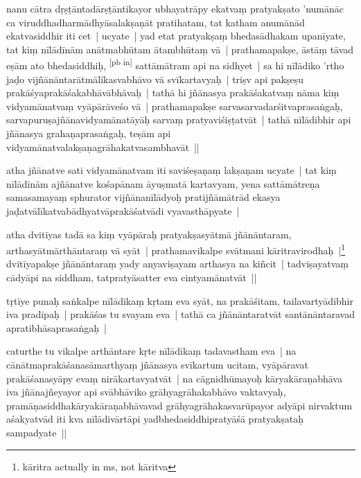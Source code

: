 \documentclass[article,a4paper]{memoir}
\begin{document}
	  \pstart nanu cā\-tra dṛṣṭā\-ntadā\-rṣṭā\-ntikayor ubhayatrā\-py ekatvaṃ pratyakṣato 'numā\-nā\-c ca viruddhadharmā\-dhyā\-salakṣaṇā\-t pratihatam, tat katham anumā\-nā\-d ekatvasiddhir iti cet | ucyate | yad etat pratyakṣaṃ bhedasā\-dhakam upanī\-yate, tat kiṃ nī\-lā\-dī\-nā\-m anā\-tmabhū\-tam ā\-tambhū\-taṃ vā\- | prathamapakṣe, ā\-stā\-ṃ tā\-vad eṣā\-m ato bhedasiddhiḥ, \leavevmode\textsuperscript{\rmlatinfont\tiny [pb in]}\label{RNAms_76a} sattā\-mā\-tram api na sidhyet | sa hi nī\-lā\-diko 'rtho jaḍo vijñā\-nā\-ntarā\-tmā\-lī\-kasvabhā\-vo vā\- svī\-kartavyaḥ | triṣv api pakṣeṣu prakā\-śyaprakā\-śakabhā\-vā\-bhā\-vaḥ | tathā\- hi jñā\-nasya prakā\-śakatvaṃ nā\-ma kiṃ vidyamā\-natvaṃ vyā\-pā\-rā\-veśo vā\- | prathamapakṣe sarvasarvadarśitvaprasaṅgaḥ, sarvapuruṣajñā\-navidyamā\-natā\-yā\-ḥ sarvaṃ pratyaviśiṣṭatvā\-t | tathā\- nī\-lā\-dibhir api jñā\-nasya grahaṇaprasaṅgaḥ, teṣā\-m api vidyamā\-natvalakṣaṇagrā\-hakatvasambhavā\-t ||
	\pend
      

	  \pstart atha jñā\-natve sati vidyamā\-natvam iti saviśeṣaṇaṃ lakṣaṇam ucyate | tat kiṃ nī\-lā\-dī\-nā\-m ajñā\-natve kośapā\-nam ā\-yuṣmatā\- kartavyam, yena sattā\-mā\-treṇa samasamayaṃ sphurator vijñā\-nanī\-lā\-dyoḥ pratijñā\-mā\-trā\-d ekasya jaḍatvā\-lī\-katvabā\-dhyatvā\-prakā\-śatvā\-di vyavasthā\-pyate |
	\pend
      

	  \pstart atha dvitī\-yas tadā\- sa kiṃ vyā\-pā\-raḥ pratyakṣasyā\-tmā\- jñā\-nā\-ntaram, arthasyā\-tmā\-rthā\-ntaraṃ vā\- syā\-t | prathamavikalpe svā\-tmani kā\-ritravirodhaḥ |\footnote{kā\-ritra actually in ms, not kā\-ritva} dvitī\-yapakṣe jñā\-nā\-ntaraṃ yady anyaviṣayam arthasya na kiñcit | tadviṣayatvaṃ cā\-dyā\-pi na siddham, tatpratyā\-satter eva cintyamā\-natvā\-t ||
	\pend
      

	  \pstart tṛtī\-ye punaḥ saṅkalpe nī\-lā\-dikaṃ kṛtam eva syā\-t, na prakā\-śitam, tailavartyā\-dibhir iva pradī\-paḥ | prakā\-śas tu svayam eva | tathā\- ca jñā\-nā\-ntaratvā\-t santā\-nā\-ntaravad apratibhā\-saprasaṅgaḥ |
	\pend
      

	  \pstart caturthe tu vikalpe arthā\-ntare kṛte nī\-lā\-dikaṃ tadavastham eva | na cā\-nā\-tmaprakā\-śanasā\-marthyaṃ jñā\-nasya svī\-kartum ucitam, vyā\-pā\-ravat prakā\-śanasyā\-py evaṃ nirā\-kartavyatvā\-t | na cā\-gnidhū\-mayoḥ kā\-ryakā\-raṇabhā\-va iva jñā\-najñeyayor api svā\-bhā\-viko grā\-hyagrā\-hakabhā\-vo vaktavyaḥ, pramā\-ṇasiddhakā\-ryakā\-raṇabhā\-vavad grā\-hyagrā\-hakasvarū\-payor adyā\-pi nirvaktum aśakyatvā\-d iti kva nī\-lā\-divā\-rtā\-pi yadbhedasiddhipratyā\-śā\- pratyakṣataḥ sampadyate ||
	\pend
      
\end{document}

